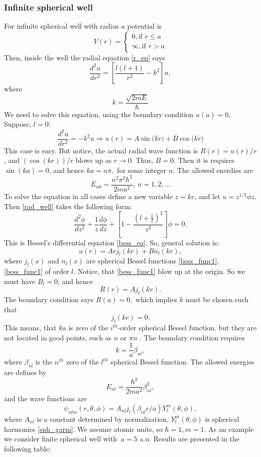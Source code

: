 \documentclass[a4paper, 12pt]{article}
\begin{document}
\subsubsection{Infinite spherical well}
For infinite spherical well with radius $a$ potential is
$$V(r)= \begin{cases}
0, \text{if } r\leq a\\
\infty, \text{if } r>a
\end{cases}$$
Then, inside the well the radial equation \eqref{r_eq} says
\begin{equation}\label{rad_well}
\frac{d^2 u}{dr^2} = [\frac{l(l+1)}{r^2} - k^2]u,
\end{equation}
where
$$k = \frac{\sqrt{2mE}}{\hbar}$$
We need to solve this equation, using the boundary condition $u(a) = 0.$
Suppose, $l=0$:
$$\frac{d^2 u}{dr^2} = -k^2 u \Rightarrow u(r) = A \sin{(kr})+B\cos{(kr})$$
This case is easy. But notice, the actual radial wave function is $R(r)= u(r)/r$, and $(\cos (kr))/r$ blows up as  $r \to 0.$ Thus, $B =0.$ Then it is requires $\sin (ka) =0$, and hence $ka = n \pi,$ for some integer $n$. The allowed enerdies are
$$E_{n0} = \frac{n^2 \pi^2 \hbar^2}{2 ma^2}, ~ n = 1,2,...$$
To solve the equation in all cases define a new variable $z= k r$, and let  $u = z^{1/2}\phi{z}.$
Then \eqref{rad_well} takes the following form:
$$\frac{d^2 \phi}{dz^2}+\frac{1}{z}\frac{d \phi}{dz}+[1 - \frac{(l+\frac{1}{2})^2}{z^2}]\phi = 0.$$
This is Bessel's differential equation \eqref{bess_eq}. So, general solution is:
$$u(r)=Ar j_l(kr)+Bn_l(kr),$$
where $j_l(x)$ and  $n_l(x)$ are spherical Bessel functions \eqref{bess_func1}, \eqref{bess_func1} of order $l$.
Notice, that  \eqref{bess_func1} blow up at the origin. So we must have $B_l=0$, and hence
$$R(r)=A j_l(kr).$$
The boundary condition says $R(a)=0,$ which implies $k$ must be chosen such that
$$j_l(kr)=0.$$
This means, that $ka$ is zero of the $i^{th}$-order spherical Bessel function, but  they are not located in good points, such as $n$ or $\pi n$ . The boundary condition requires 
$$k = \frac{1}{a}\beta_{nl},$$
where $\beta_{nl}$ is the $n^{th}$ zero of the  $l^{th}$  spherical Bessel function. The allowed energies are defines by
\begin{equation}\label{sol_inf_well}
E_{nl}=\frac{\hbar^2}{2ma^2}\beta_{nl}^2,
\end{equation}
and the wave functions are
$$\psi_{nlm}(r, \theta,\phi) = A_{nl} j_l(\beta_{nl}r/a) Y_l^m(\theta, \phi),$$
where $A_{nl}$ is a constant determined by normalization, $Y_l^m(\theta, \phi)$ is spherical harmonics \eqref{sph_garm}.
We assume atomic units, so $\hbar = 1, m=1.$ As an example we consider finite spherical well with $\ a = 5 $ a.u. Results are presented in the following table: 
\end{document}

